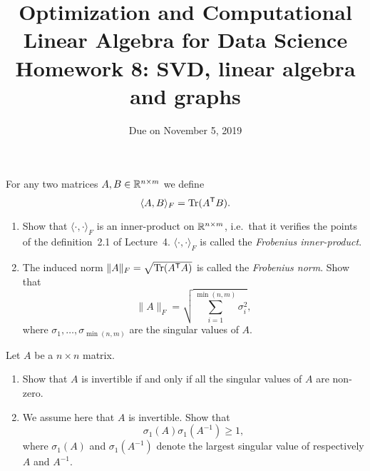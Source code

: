 \documentclass[11pt,nocut]{article}
\title{\vspace{-2.0cm}%
	Optimization and Computational Linear Algebra for Data Science\\
Homework 8: SVD, linear algebra and graphs}
\date{\vspace{-1cm}Due on November 5, 2019}
\begin{document}
\maketitle




\begin{problem}[2 points]
	For any two matrices $A,B \in \mathbb{R}^{n\times m}$ we define
	$$
	\langle A,B \rangle_{F} = {{\rm Tr}}(A^{{\sf T}} B).
	$$
	\begin{enumerate}[label=\normalfont(\textbf{\alph*})]
	\item Show that $\langle \cdot, \cdot \rangle_F$ is an inner-product on $\mathbb{R}^{n \times m}$, i.e.\ that it verifies the points of the definition~2.1 of Lecture~4. $\langle \cdot, \cdot \rangle_F$ is called the \emph{Frobenius inner-product}.
		\item The induced norm $\|A\|_F = \sqrt{{{\rm Tr}}(A^{{\sf T}} A)}$ is called the \emph{Frobenius norm}.
			Show that
			$$
			\|A\|_F = \sqrt{\sum_{i=1}^{\min(n,m)} \sigma_i^2},
			$$
			where $\sigma_1, \dots, \sigma_{\min(n,m)}$ are the singular values of $A$.
	\end{enumerate}
\end{problem}

\vspace{1mm}

\begin{problem}[2 points]
	Let $A$ be a $n \times n$ matrix.
	\begin{enumerate}[label=\normalfont(\textbf{\alph*})]
		\item Show that $A$ is invertible if and only if all the singular values of $A$ are non-zero.
		\item We assume here that $A$ is invertible. Show that 
				$$
				\sigma_1(A) \sigma_1(A^{-1}) \geq 1,
				$$
				where $\sigma_1(A)$ and $\sigma_1(A^{-1})$ denote the largest singular value of respectively $A$ and $A^{-1}$.
	\end{enumerate}
\end{problem}

\vspace{1mm}
\end{document}
